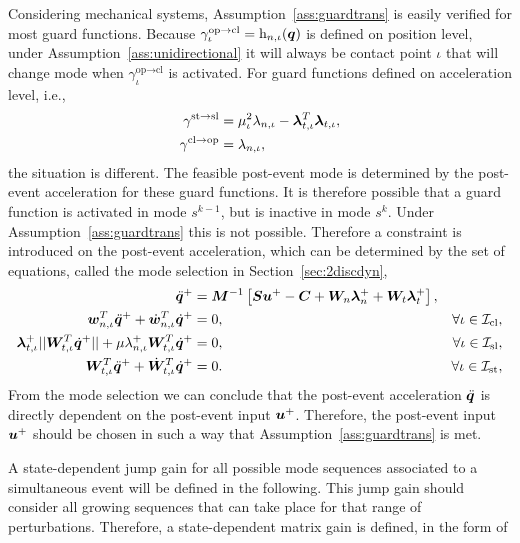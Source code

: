 \documentclass[../DC2017114Bouma.tex]{subfiles}
\begin{document}
\begin{sloppypar}
\begin{myremark}
Considering mechanical systems, Assumption~\ref{ass:guardtrans} is easily verified for most guard functions. Because $\gamma^{\text{op}\rightarrow\text{cl}}_{\iota} = \mathrm{h}_{n,\iota}({\boldsymbol{q}})$ is defined on position level, under Assumption~\ref{ass:unidirectional} it will always be contact point $\iota$ that will change mode when $\gamma^{\text{op}\rightarrow\text{cl}}_{\iota}$ is activated. For guard functions defined on acceleration level, i.e.,
\begin{align*}
\gamma^{\textnormal{st}\rightarrow\textnormal{sl}} &= \mu_\iota^2\lambda_{n,\iota} - \boldsymbol{\lambda}^T_{t,\iota}\boldsymbol{\lambda}_{t,\iota},\\
\gamma^{\textnormal{cl}\rightarrow\textnormal{op}} &= \lambda_{n,\iota},
\end{align*}
the situation is different. The feasible post-event mode is determined by the post-event acceleration for these guard functions. It is therefore possible that a guard function is activated in mode $s^{k-1}$, but is inactive in mode $s^{k}$. Under Assumption~\ref{ass:guardtrans} this is not possible. Therefore a constraint is introduced on the post-event acceleration, which can be determined by the set of equations, called the mode selection in Section~\ref{sec:2discdyn},
\begin{align}
\ddot{{\boldsymbol{q}}}^+ &= {\boldsymbol{M}}^{-1}\left[{\boldsymbol{S}}{\boldsymbol{u}}^+ - {\boldsymbol{C}} + {\boldsymbol{W}}_{n}\boldsymbol{\lambda}^+_{n} + {\boldsymbol{W}}_{t}\boldsymbol{\lambda}^+_{t}\right], &  \nonumber\\
{\boldsymbol{w}}^T_{n,\iota}\ddot{{\boldsymbol{q}}}^+ + \dot{{\boldsymbol{w}}}^T_{n,\iota}\dot{{\boldsymbol{q}}}^+ &= 0, & \forall \iota\in\mathcal{I}_{\text{cl}},\nonumber\\
\boldsymbol{\lambda}^+_{t,\iota}||{\boldsymbol{W}}_{t,\iota}^T\dot{{\boldsymbol{q}}}^+|| + \mu\lambda^+_{n,\iota}{\boldsymbol{W}}_{t,\iota}^T\dot{{\boldsymbol{q}}}^+ &= 0, & \forall \iota\in\mathcal{I}_{\text{sl}},\nonumber\\
{\boldsymbol{W}}^T_{t,\iota}\ddot{{\boldsymbol{q}}}^+ + \dot{{\boldsymbol{W}}}^T_{t,\iota}\dot{{\boldsymbol{q}}}^+ &= 0. & \forall \iota\in\mathcal{I}_{\text{st}},\nonumber
\end{align}
From the mode selection we can conclude that the post-event acceleration $\ddot{{\boldsymbol{q}}}$ is directly dependent on the post-event input ${\boldsymbol{u}}^+$. Therefore, the post-event input ${\boldsymbol{u}}^+$ should be chosen in such a way that Assumption~\ref{ass:guardtrans} is met.
\end{myremark}
\end{sloppypar}
A state-dependent jump gain for all possible mode sequences associated to a simultaneous event will be defined in the following. This jump gain should consider all growing sequences that can take place for that range of perturbations. Therefore, a state-dependent matrix gain is defined, in the form of
\end{document}
